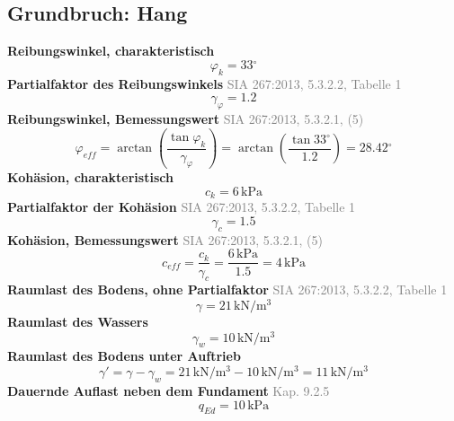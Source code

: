 \documentclass[11pt,a4paper]{article}
\newcommand{\normref}[1]{{\small\textcolor{gray}{#1}}}
\begin{document}
\subsection{Grundbruch: Hang}
\noindent\textbf{Reibungswinkel, charakteristisch}
\begin{equation*}
\varphi_k = 33{}^{\circ}
\end{equation*}
\noindent\textbf{Partialfaktor des Reibungswinkels} \hfill \normref{SIA 267:2013, 5.3.2.2, Tabelle 1}
\begin{equation*}
\gamma_{\varphi} = 1.2
\end{equation*}
\noindent\textbf{Reibungswinkel, Bemessungswert} \hfill \normref{SIA 267:2013, 5.3.2.1, (5)}
\begin{equation*}
\varphi_{eff} = \arctan\left(\frac{\tan \varphi_k}{\gamma_{\varphi}}\right) = \arctan\left(\frac{\tan 33{}^{\circ}}{1.2}\right) = 28.42{}^{\circ}
\end{equation*}
\noindent\textbf{Kohäsion, charakteristisch}
\begin{equation*}
c_k = 6\,\mathrm{kPa}
\end{equation*}
\noindent\textbf{Partialfaktor der Kohäsion} \hfill \normref{SIA 267:2013, 5.3.2.2, Tabelle 1}
\begin{equation*}
\gamma_c = 1.5
\end{equation*}
\noindent\textbf{Kohäsion, Bemessungswert} \hfill \normref{SIA 267:2013, 5.3.2.1, (5)}
\begin{equation*}
c_{eff} = \frac{c_k}{\gamma_c} = \frac{6\,\mathrm{kPa}}{1.5} = 4\,\mathrm{kPa}
\end{equation*}
\noindent\textbf{Raumlast des Bodens, ohne Partialfaktor} \hfill \normref{SIA 267:2013, 5.3.2.2, Tabelle 1}
\begin{equation*}
\gamma = 21\,\mathrm{kN}/\mathrm{m}^{3}
\end{equation*}
\noindent\textbf{Raumlast des Wassers}
\begin{equation*}
\gamma_w = 10\,\mathrm{kN}/\mathrm{m}^{3}
\end{equation*}
\noindent\textbf{Raumlast des Bodens unter Auftrieb}
\begin{equation*}
\gamma' = \gamma - \gamma_w = 21\,\mathrm{kN}/\mathrm{m}^{3} - 10\,\mathrm{kN}/\mathrm{m}^{3} = 11\,\mathrm{kN}/\mathrm{m}^{3}
\end{equation*}
\noindent\textbf{Dauernde Auflast neben dem Fundament} \hfill \normref{Kap. 9.2.5}
\begin{equation*}
q_{Ed} = 10\,\mathrm{kPa}
\end{equation*}
\end{document}
